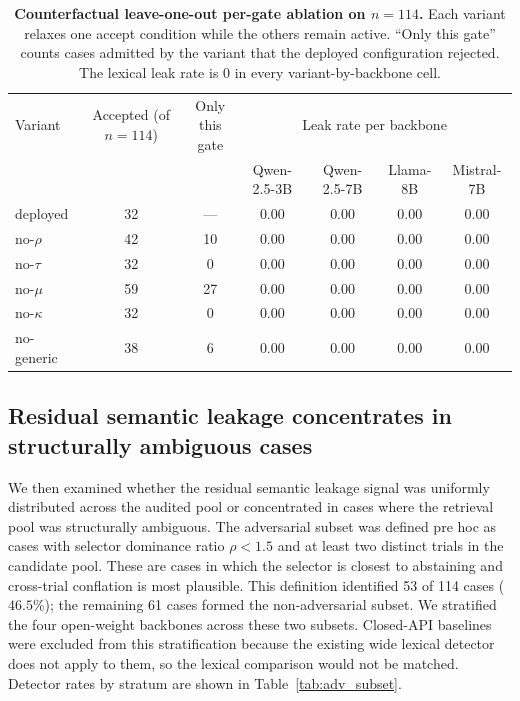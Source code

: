 \documentclass[pdflatex,Numbered]{sn-jnl}
\theoremstyle{plain}
\begin{document}
\begin{table}[!htbp]
\centering
\caption{\textbf{Counterfactual leave-one-out per-gate ablation on $n=114$.} Each variant relaxes one accept condition while the others remain active. ``Only this gate'' counts cases admitted by the variant that the deployed configuration rejected. The lexical leak rate is $0$ in every variant-by-backbone cell.}
\label{tab:per_gate}
\small
\setlength{\tabcolsep}{4pt}
\begin{tabular}{l c c | c c c c}
\toprule
Variant & \makecell[c]{Accepted\\(of $n{=}114$)} & \makecell[c]{Only\\this gate} & \multicolumn{4}{c}{Leak rate per backbone} \\
& & & Qwen-2.5-3B & Qwen-2.5-7B & Llama-8B & Mistral-7B \\
\midrule
deployed             & 32 & --- & 0.00 & 0.00 & 0.00 & 0.00 \\
no-$\rho$            & 42 & 10  & 0.00 & 0.00 & 0.00 & 0.00 \\
no-$\tau$            & 32 & 0   & 0.00 & 0.00 & 0.00 & 0.00 \\
no-$\mu$             & 59 & 27  & 0.00 & 0.00 & 0.00 & 0.00 \\
no-$\kappa$          & 32 & 0   & 0.00 & 0.00 & 0.00 & 0.00 \\
no-generic           & 38 & 6   & 0.00 & 0.00 & 0.00 & 0.00 \\
\bottomrule
\end{tabular}
\end{table}

\subsection{Residual semantic leakage concentrates in structurally ambiguous cases}
\label{sec:results_adversarial}

We then examined whether the residual semantic leakage signal was uniformly distributed across the audited pool or concentrated in cases where the retrieval pool was structurally ambiguous. The adversarial subset was defined pre hoc as cases with selector dominance ratio $\rho < 1.5$ and at least two distinct trials in the candidate pool. These are cases in which the selector is closest to abstaining and cross-trial conflation is most plausible. This definition identified 53 of 114 cases ($46.5\%$); the remaining 61 cases formed the non-adversarial subset. We stratified the four open-weight backbones across these two subsets. Closed-API baselines were excluded from this stratification because the existing wide lexical detector does not apply to them, so the lexical comparison would not be matched. Detector rates by stratum are shown in Table~\ref{tab:adv_subset}.
\end{document}
